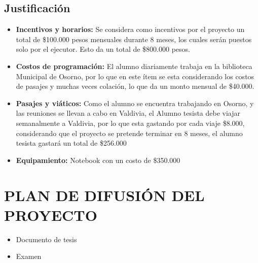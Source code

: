 \documentclass[12pt]{article}
\begin{document}
	
	\subsection{Justificación}
	\begin{itemize}
		\item {\bf Incentivos y horarios:} Se considera como incentivos por el proyecto un total de \$100.000 pesos mensuales durante 8 meses, los cuales serán puestos solo por el ejecutor. Esto da un total de \$800.000 pesos.
		
		\item {\bf Costos de programación:}  El alumno diariamente trabaja en la biblioteca Municipal de Osorno, por lo que en este ítem se esta considerando los costos de pasajes y muchas veces colación, lo que da un monto mensual de \$40.000.
		
		
	
		
		\item {\bf Pasajes y viáticos:} Como el alumno se encuentra trabajando en Osorno, y las reuniones se llevan a cabo en Valdivia, el Alumno tesista debe viajar semanalmente a Valdivia, por lo que esta gastando por cada viaje \$8.000, considerando que el proyecto se pretende terminar en 8 meses, el alumno tesista gastará un total de \$256.000
		
		
		\item {\bf Equipamiento:} Notebook con un costo de \$350.000
		
		
	\end{itemize}
	
	
\section{PLAN DE DIFUSIÓN DEL PROYECTO }
	
	\begin{itemize}
		\item Documento de tesis
		\item Examen
	\end{itemize}
	
\end{document}
